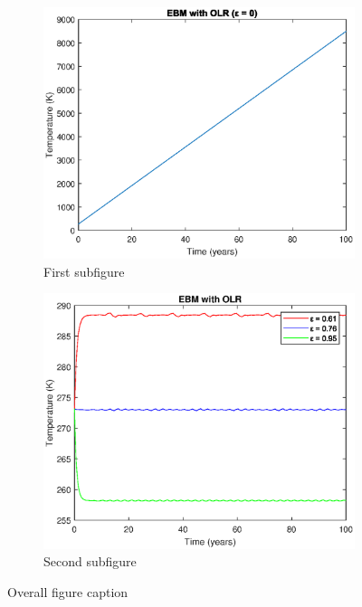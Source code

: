\documentclass[12pt]{article}
\begin{document}
\begin{figure}[ht]
    \centering
    \begin{subfigure}[b]{0.4\textwidth}
        \centering
        \includegraphics[width=\textwidth]{ebm_with_olr_0.eps}
            \caption{First subfigure}
        \label{fig:sub1}
    \end{subfigure}
    \hfill %
    \begin{subfigure}[b]{0.4\textwidth}
        \centering
        \includegraphics[width=\textwidth]{ebm_with_diff_olrs.eps}
        \caption{Second subfigure}
        \label{fig:sub2}
    \end{subfigure}
    \caption{Overall figure caption}
    \label{fig:test}
\end{figure}
\end{document}
